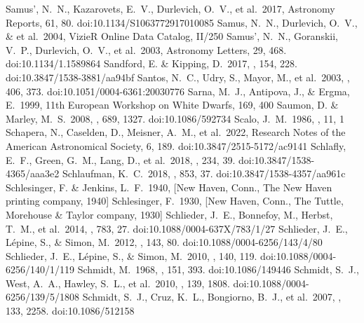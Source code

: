 \documentclass[twocolumn,tighten,twocolappendix]{aastex631}
\begin{document}
\begin{thebibliography}{}
 Samus', N.~N., Kazarovets, E.~V., Durlevich, O.~V., et al.\ 2017, Astronomy Reports, 61, 80. doi:10.1134/S1063772917010085
 Samus, N.~N., Durlevich, O.~V., \& et al.\ 2004, VizieR Online Data Catalog, II/250
 Samus', N.~N., Goranskii, V.~P., Durlevich, O.~V., et al.\ 2003, Astronomy Letters, 29, 468. doi:10.1134/1.1589864
 Sandford, E. \& Kipping, D.\ 2017, \aj, 154, 228. doi:10.3847/1538-3881/aa94bf
 Santos, N.~C., Udry, S., Mayor, M., et al.\ 2003, \aap, 406, 373. doi:10.1051/0004-6361:20030776
 Sarna, M.~J., Antipova, J., \& Ergma, E.\ 1999, 11th European Workshop on White Dwarfs, 169, 400
 Saumon, D. \& Marley, M.~S.\ 2008, \apj, 689, 1327. doi:10.1086/592734
 Scalo, J.~M.\ 1986, \fcp, 11, 1
 Schapera, N., Caselden, D., Meisner, A.~M., et al.\ 2022, Research Notes of the American Astronomical Society, 6, 189. doi:10.3847/2515-5172/ac9141
 Schlafly, E.~F., Green, G.~M., Lang, D., et al.\ 2018, \apjs, 234, 39. doi:10.3847/1538-4365/aaa3e2
 Schlaufman, K.~C.\ 2018, \apj, 853, 37. doi:10.3847/1538-4357/aa961c
 Schlesinger, F. \& Jenkins, L.~F.\ 1940, [New Haven, Conn., The New Haven printing company, 1940]
 Schlesinger, F.\ 1930, [New Haven, Conn., The Tuttle, Morehouse \& Taylor company, 1930]
 Schlieder, J.~E., Bonnefoy, M., Herbst, T.~M., et al.\ 2014, \apj, 783, 27. doi:10.1088/0004-637X/783/1/27
 Schlieder, J.~E., L{\'e}pine, S., \& Simon, M.\ 2012, \aj, 143, 80. doi:10.1088/0004-6256/143/4/80
 Schlieder, J.~E., L{\'e}pine, S., \& Simon, M.\ 2010, \aj, 140, 119. doi:10.1088/0004-6256/140/1/119
 Schmidt, M.\ 1968, \apj, 151, 393. doi:10.1086/149446
 Schmidt, S.~J., West, A.~A., Hawley, S.~L., et al.\ 2010, \aj, 139, 1808. doi:10.1088/0004-6256/139/5/1808
 Schmidt, S.~J., Cruz, K.~L., Bongiorno, B.~J., et al.\ 2007, \aj, 133, 2258. doi:10.1086/512158

\end{thebibliography}
\end{document}
